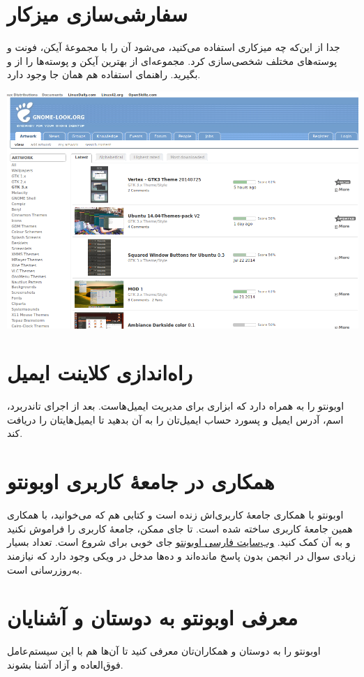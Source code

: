 \section{سفارشی‌سازی میزکار}
جدا از این‌که چه میزکاری استفاده می‌کنید، می‌شود آن را با مجموعهٔ آیکن، فونت و پوسته‌های مختلف شخصی‌سازی کرد. مجموعه‌ای از بهترین آیکن و پوسته‌ها را از  و  بگیرید. راهنمای استفاده هم همان جا وجود دارد.
\begin{center}
\includegraphics[scale=0.4]{pics/34.png}
\end{center}

\section{راه‌اندازی کلاینت ایمیل}
اوبونتو  را به همراه دارد که ابزاری برای مدیریت ایمیل‌هاست. بعد از اجرای تاندربرد، اسم، آدرس ایمیل و پسورد حساب ایمیل‌تان را به آن بدهید تا ایمیل‌هایتان را دریافت کند.

\section{همکاری در جامعهٔ کاربری اوبونتو}
اوبونتو با همکاری جامعهٔ کاربری‌اش زنده است و کتابی هم که می‌خوانید، با همکاری همین جامعهٔ کاربری ساخته شده است. تا جای ممکن، جامعهٔ کاربری را فراموش نکنید و به آن کمک کنید. \href{http://www.ubuntu.ir}{وب‌سایت فارسی اوبونتو} جای خوبی برای شروع است. تعداد بسیار زیادی سوال در انجمن بدون پاسخ مانده‌اند و ده‌ها مدخل در ویکی وجود دارد که نیازمند به‌روزرسانی است.

\section{معرفی اوبونتو به دوستان و آشنایان}
اوبونتو را به دوستان و همکاران‌تان معرفی کنید تا آن‌ها هم با این سیستم‌عامل فوق‌العاده و آزاد آشنا بشوند.
